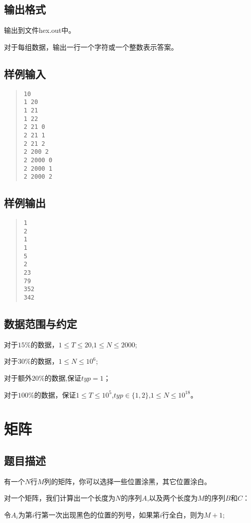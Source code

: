 ﻿\documentclass[12pt, a4paper]{article}
\begin{document}
\subsection{输出格式}

输出到文件hex.out中。

对于每组数据，输出一行一个字符或一个整数表示答案。

\subsection{样例输入}
\begin{quote}
\begin{verbatim}
10
1 20
1 21
1 22
2 21 0
2 21 1
2 21 2
2 200 2
2 2000 0
2 2000 1
2 2000 2
\end{verbatim}
\end{quote}
\subsection{样例输出}
\begin{quote}
\begin{verbatim}
1
2
1
1
5
2
23
79
352
342
\end{verbatim}
\end{quote}
\subsection{数据范围与约定}

对于$15\%$的数据，$1 \leq T \leq 20$,$1 \leq N \leq 2000$;

对于$30\%$的数据，$1 \leq N \leq 10^6$;

对于额外$20\%$的数据,保证$typ=1$；

对于$100\%$的数据，保证$1 \leq T \leq 10^5$,$typ \in \{1,2\}$,$1 \leq N \leq 10^{18}$。

\newpage
\section{矩阵}
\subsection{题目描述}

有一个$N$行$M$列的矩阵，你可以选择一些位置涂黑，其它位置涂白。

对一个矩阵，我们计算出一个长度为$N$的序列$A$,以及两个长度为$M$的序列$B$和$C$：

令$A_i$为第$i$行第一次出现黑色的位置的列号，如果第$i$行全白，则为$M+1$;
\end{document}
